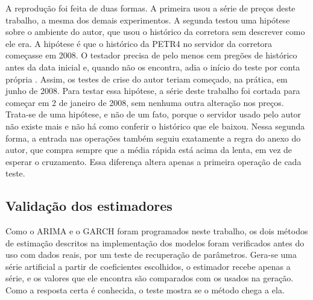 A reprodução foi feita de duas formas. A primeira usou a série de preços deste
trabalho, a mesma dos demais experimentos. A segunda testou uma hipótese sobre o
ambiente do autor, que usou o histórico da corretora sem descrever como ele era.
A hipótese é que o histórico da PETR4 no servidor da corretora começasse em 2008.
O testador precisa de pelo menos cem pregões de histórico antes da data inicial
e, quando não os encontra, adia o início do teste por conta própria
\cite{metaquotesTeste}. Assim, os testes de crise do autor teriam começado, na
prática, em junho de 2008. Para testar essa hipótese, a série deste trabalho foi
cortada para começar em 2 de janeiro de 2008, sem nenhuma outra alteração nos
preços. Trata-se de uma hipótese, e não de um fato, porque o servidor usado pelo
autor não existe mais e não há como conferir o histórico que ele baixou. Nessa
segunda forma, a entrada nas operações também seguiu exatamente a regra do anexo
do autor, que compra sempre que a média rápida está acima da lenta, em vez de
esperar o cruzamento. Essa diferença altera apenas a primeira operação de cada
teste.

\subsection{Validação dos estimadores}

Como o ARIMA e o GARCH foram programados neste trabalho, os dois métodos de
estimação descritos na implementação dos modelos foram verificados antes do uso
com dados reais, por um teste de recuperação de parâmetros. Gera-se uma série
artificial a partir de coeficientes escolhidos, o estimador recebe apenas a série,
e os valores que ele encontra são comparados com os usados na geração. Como a
resposta certa é conhecida, o teste mostra se o método chega a ela.

